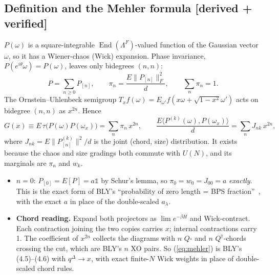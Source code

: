 \documentclass[11pt]{article}
\newcommand{\one}{\mathds 1}
\newcommand{\End}{\operatorname{End}}
\newcommand{\tagbox}[2]{\textsf{\small\color{#1}[#2]}}
\newcommand{\VER}{\tagbox{cder}{derived + verified}}
\theoremstyle{remark}
\begin{document}
\subsection{Definition and the Mehler formula \VER}
$P(\omega)$ is a square-integrable $\End(\Lambda^F)$-valued function of the Gaussian vector $\omega$, so it has a
Wiener-chaos (Wick) expansion. Phase invariance, $P(e^{i\theta}\omega)=P(\omega)$, leaves only bidegrees $(n,n)$:
\begin{equation}
P=\sum_{n\ge0}P_{[n]},\qquad \pi_n=\frac{E\|P_{[n]}\|_F^2}{d},\qquad \sum_n\pi_n=1 .
\end{equation}
The Ornstein--Uhlenbeck semigroup $T_xf(\omega)=E_{\omega'}f(x\omega+\sqrt{1-x^2}\omega')$ acts on bidegree $(n,n)$ as
$x^{2n}$. Hence
\begin{equation}
G(x)\equiv E\,\tau\big(P(\omega)P(\omega_x)\big)=\sum_n\pi_n\,x^{2n},\qquad
\frac{E\langle P^{(k)}(\omega),P(\omega_x)\rangle}{d}=\sum_nJ_{nk}\,x^{2n},
\label{eq:mehler}
\end{equation}
where $J_{nk}=E\|P^{(k)}_{[n]}\|^2/d$ is the joint (chord, size) distribution. It exists because the chaos and size
gradings both commute with $U(N)$, and its marginals are $\pi_n$ and $w_k$.
\begin{itemize}\itemsep1pt
\item $n=0$: $P_{[0]}=E[P]=a\one$ by Schur's lemma, so $\pi_0=w_0=J_{00}=a$ \emph{exactly}. This is the exact form of
  BLY's ``probability of zero length = BPS fraction''~\cite{BLY}, with the exact $a$ in place of the double-scaled
  $a_\lambda$.
\item \textbf{Chord reading.} Expand both projectors as $\lim e^{-\beta H}$ and Wick-contract. Each contraction joining
  the two copies carries $x$; internal contractions carry 1. The coefficient of $x^{2n}$ collects the diagrams with
  $n$ $Q$- and $n$ $Q^\dagger$-chords crossing the cut, which are BLY's $n$ XO pairs. So (\ref{eq:mehler}) is BLY's
  (4.5)--(4.6) with $q^\Delta\to x$, with exact finite-$N$ Wick weights in place of double-scaled chord rules.
\end{itemize}
\end{document}
